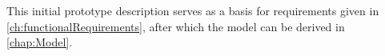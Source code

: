 






This initial prototype description serves as a basis for requirements given in \autoref{ch:functionalRequirements}, after which the model can be derived in \autoref{chap:Model}.

